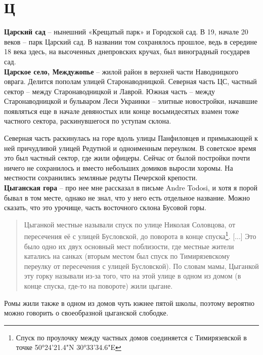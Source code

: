 \chapter*{Ц}

\textbf{Царский сад} – нынешний «Крещатый парк» и Городской сад. В 19, начале 20 веков – парк Царский сад. В названии том сохранялось прошлое, ведь в середине 18 века здесь, на высоченных днепровских кручах, был виноградный государев сад.\\

\textbf{Царское село, Междужопье} – жилой район в верхней части Наводницкого оврага. Делится пополам улицей Старонаводницкой. Северная часть ЦС, частный сектор – между Старонаводницкой и Лаврой. Южная часть – между Старонаводницкой и бульваром Леси Украинки – элитные новостройки, начавшие появляться еще в начале девяностых или конце восьмидесятых взамен тоже частного сектора, раскинувшегося по уступам склона.

Северная часть раскинулась на горе вдоль улицы Панфиловцев и примыкающей к ней причудливой улицей Редутной и одноименным переулком. В советское время это был частный сектор, где жили офицеры. Сейчас от былой постройки почти ничего не сохранилось и вместо небольших домиков выросли хоромы. На местности сохранились земляные редуты Печерской крепости.\\

\textbf{Цыганская гора} – про нее мне рассказал в письме Andre Todosi, и хотя я порой бывал в том месте, однако не знал, что у него есть отдельное название. Можно сказать, что это урочище, часть восточного склона Бусовой горы.

\begin{quotation}
Цыганкой местные называли спуск по улице Николая Соловцова, от пересечения её с улицей Бусловской, до поворота в конце спуска\footnote{Спуск по проулочку между частных домов соединяется с Тимирязевской в точке 50°24'21.4"N 30°33'34.6"E}. [...] Это было одно их двух основный мест поблизости, где местные жители катались на санках (вторым
местом был спуск по Тимирязевскому переулку от пересечения с улицей Бусловской). По словам мамы, Цыганкой эту горку называли из-за того, что на этой улице в одном из домом (в конце спуска, где-то на повороте) жили цыгане.
\end{quotation}

Ромы жили также в одном из домов чуть южнее пятой школы, поэтому вероятно можно говорить о своеобразной цыганской слободке.\\

